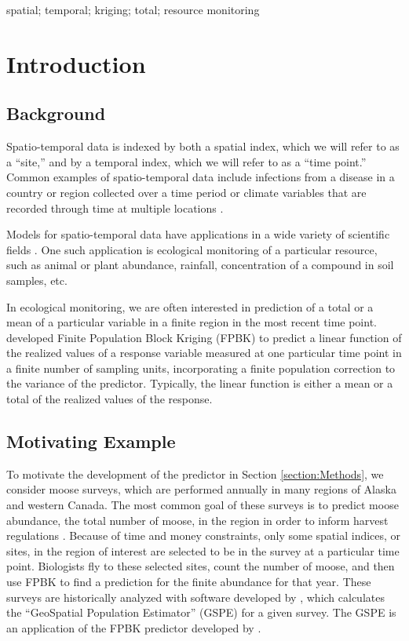 \documentclass[]{interact}
\theoremstyle{plain}%
\theoremstyle{definition}
\theoremstyle{remark}
\begin{document}
\begin{keywords}
spatial; temporal; kriging; total; resource monitoring
\end{keywords}

\section{Introduction}

\subsection{Background}

Spatio-temporal data is indexed by both a spatial index, which we will
refer to as a ``site,'' and by a temporal index, which we will refer to
as a ``time point.'' Common examples of spatio-temporal data include
infections from a disease in a country or region collected over a time
period \citep[e.g.][]{martinez2008autoregressive, sahu2022bayesian} or
climate variables that are recorded through time at multiple locations
\citep{lemos2009spatio}.

Models for spatio-temporal data have applications in a wide variety of
scientific fields \citep[see][ for many examples]{wikle2019spatio}. One
such application is ecological monitoring of a particular resource, such
as animal or plant abundance, rainfall, concentration of a compound in
soil samples, etc.

In ecological monitoring, we are often interested in prediction of a
total or a mean of a particular variable in a finite region in the most
recent time point. \citet{ver2008spatial} developed Finite Population
Block Kriging (FPBK) to predict a linear function of the realized values
of a response variable measured at one particular time point in a finite
number of sampling units, incorporating a finite population correction
to the variance of the predictor. Typically, the linear function is
either a mean or a total of the realized values of the response.

\subsection{Motivating Example}

To motivate the development of the predictor in Section
\ref{section:Methods}, we consider moose surveys, which are performed
annually in many regions of Alaska and western Canada. The most common
goal of these surveys is to predict moose abundance, the total number of
moose, in the region in order to inform harvest regulations
\citep{kellie2019challenges}. Because of time and money constraints,
only some spatial indices, or sites, in the region of interest are
selected to be in the survey at a particular time point. Biologists fly
to these selected sites, count the number of moose, and then use FPBK to
find a prediction for the finite abundance for that year. These surveys
are historically analyzed with software developed by
\citet{delong2006geospatial}, which calculates the ``GeoSpatial
Population Estimator'' (GSPE) for a given survey. The GSPE is an
application of the FPBK predictor developed by \citet{ver2008spatial}.
\end{document}
